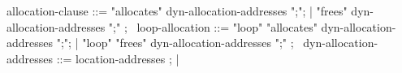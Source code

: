 \begin{syntax}
  allocation-clause ::= { "allocates" } dyn-allocation-addresses ";";
                    | { "frees" } dyn-allocation-addresses ";" ;
  \
  loop-allocation ::= { "loop" "allocates" } dyn-allocation-addresses ";";
                    | { "loop" "frees" } dyn-allocation-addresses ";" ;
  \
  dyn-allocation-addresses ::= location-addresses ;
                       | \nothing
 \end{syntax}
